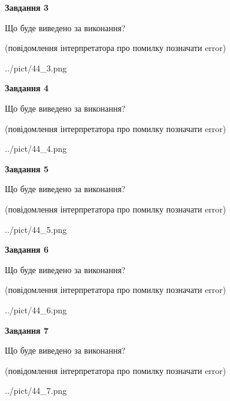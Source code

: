 \documentclass[12pt, ukrainian]{article}
\begin{document}
{\begin {large}
{\begin {center}\textbf{Завдання 3}\end {center}}\par
Що буде виведено за виконання?\par
 (повідомлення інтерпретатора про помилку позначати error)\par
\begin{center}
	{../pict/44_3.png}
\end{center}
\newpage

{\begin {center}\textbf{Завдання 4}\end {center}}\par
Що буде виведено за виконання?\par
 (повідомлення інтерпретатора про помилку позначати error)\par
\begin{center}
	{../pict/44_4.png}
\end{center}
\newpage

{\begin {center}\textbf{Завдання 5}\end {center}}\par
Що буде виведено за виконання?\par
 (повідомлення інтерпретатора про помилку позначати error)\par
\begin{center}
	{../pict/44_5.png}
\end{center}
\newpage

{\begin {center}\textbf{Завдання 6}\end {center}}\par
Що буде виведено за виконання?\par
 (повідомлення інтерпретатора про помилку позначати error)\par
\begin{center}
	{../pict/44_6.png}
\end{center}
\newpage

{\begin {center}\textbf{Завдання 7}\end {center}}\par
Що буде виведено за виконання?\par
 (повідомлення інтерпретатора про помилку позначати error)\par
\begin{center}
	{../pict/44_7.png}
\end{center}
\newpage


\end{large}}
\end{document}
